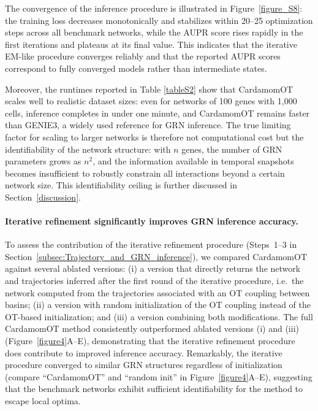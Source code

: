 \documentclass[a4paper, 11pt]{article}
\theoremstyle{plain}
\theoremstyle{remark}
\newcommand*{\firstreview}[1]{{\color{black}#1}}
\begin{document}
The convergence of the inference procedure is illustrated in Figure~\ref{figure_S8}: 
the training loss decreases monotonically and stabilizes within 20--25 optimization 
steps across all benchmark networks, while the AUPR score rises rapidly in the first 
iterations and plateaus at its final value. This indicates that the iterative EM-like 
procedure converges reliably and that the reported AUPR scores correspond to 
fully converged models rather than intermediate states.

Moreover, the runtimes reported in Table \ref{tableS2} show that CardamomOT scales 
well to realistic dataset sizes: even for networks of 100 genes with 1{,}000 cells, inference 
completes in under one minute, and CardamomOT remains faster than GENIE3, 
a widely used reference for GRN inference. The true limiting factor for 
scaling to larger networks is therefore not computational cost but the 
identifiability of the network structure: with $n$ genes, the number of 
GRN parameters grows as $n^2$, and the information available in temporal 
snapshots becomes insufficient to robustly constrain all interactions beyond 
a certain network size. This identifiability ceiling is further discussed in 
Section~\ref{discussion}.

\paragraph{Iterative refinement significantly improves GRN inference accuracy.}
To assess the contribution of the iterative refinement procedure (Steps~1--3 in Section~\ref{subsec:Trajectory_and_GRN_inference}), we compared CardamomOT against several ablated versions: (i) a version that directly returns the network and trajectories inferred after the first round of the iterative procedure, i.e.\ the network computed from the trajectories associated with an OT coupling between basins; (ii) a version with random initialization of the OT coupling instead of the \firstreview{OT}-based initialization; and (iii) a version combining both modifications. The full CardamomOT method consistently outperformed ablated versions (i) and (iii) (Figure~\ref{figure4}A--E), demonstrating that the iterative refinement procedure does contribute to improved inference accuracy. Remarkably, the iterative procedure converged to similar GRN structures regardless of initialization (compare “CardamomOT” and “random init” in Figure~\ref{figure4}A--E), suggesting that the benchmark networks exhibit sufficient identifiability for the method to escape local optima.
\end{document}
